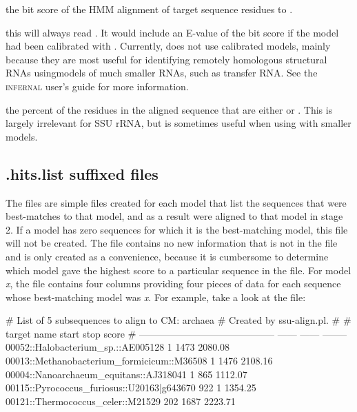 \begin{wideitem}

\item[\emprog{bit sc}] the bit score of the HMM alignment of
  target sequence residues  to .

\item[\emprog{E-value}] this will always read \prog{-}. It would
  include an E-value of the bit score if the model had been calibrated
  with . Currently,  does not use
  calibrated models, mainly because they are most useful for
  identifying remotely homologous structural RNAs usingmodels of
  much smaller RNAs, such as transfer RNA. See the \textsc{infernal}
  user's guide for more information.

\item[\emprog{GC\%}] the percent of the residues in the aligned
  sequence that are either  or . This is largely
  irrelevant for SSU rRNA, but is sometimes useful when using
   with smaller models.
\end{wideitem}

\subsection{.hits.list suffixed files}

The  files are simple files created for each model
that list the sequences that were best-matches to that model, and as a
result were aligned to that model in stage 2. If a model has zero
sequences for which it is the best-matching model, this file will not
be created. The file contains no new information that is not in the
 file and is only created as a convenience, because it is
cumbersome to determine which model gave the highest score to a
particular sequence in the  file.  For model \emph{x}, the
 file contains four columns providing four pieces of
data for each sequence whose best-matching model was \emph{x}. For
example, take a look at the 
file:

\begin{sreoutput}
# List of 5 subsequences to align to CM: archaea
# Created by ssu-align.pl.
#
# target name                                  start    stop     score
# ------------------------------------------  ------  ------  --------
  00052::Halobacterium_sp.::AE005128               1    1473   2080.08
  00013::Methanobacterium_formicicum::M36508       1    1476   2108.16
  00004::Nanoarchaeum_equitans::AJ318041           1     865   1112.07
  00115::Pyrococcus_furiosus::U20163|g643670     922       1   1354.25
  00121::Thermococcus_celer::M21529              202    1687   2223.71
\end{sreoutput}

